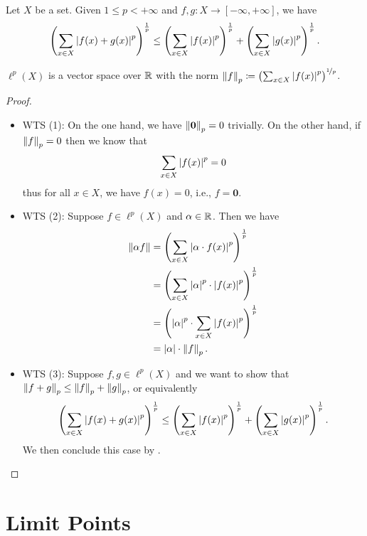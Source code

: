 \documentclass{techreport}
\begin{document}
\begin{theorem}\label{The:MinkowskisInequality}
	Let $X$ be a set.
	Given $1 \le p < +\infty$ and $f,g:X \to [-\infty,+\infty]$, we have
	\begin{equation*}
		\left({ \sum_{x \in X} \left|{f(x)+g(x)}\right|^p }\right)^{\frac{1}{p}} \le \left({ \sum_{x \in X} \left|{f(x)}\right|^p }\right)^{\frac{1}{p}} + \left({ \sum_{x \in X} \left|{g(x)}\right|^p }\right)^{\frac{1}{p}}.
	\end{equation*}
\end{theorem}

\begin{proposition}\label{Prop:lpVectorSpace}
	$\ell^p(X)$ is a vector space over $\mathbb{R}$ with the norm $\left\|{f}\right\|_p \coloneqq  \left({\sum_{x \in X} \left|{f(x)}\right|^p}\right)^{\nicefrac{1}{p}}$.
\end{proposition}
\begin{proof}
	\begin{itemize}
		\item WTS (1):
		On the one hand, we have $\left\|{\mathbf{0}}\right\|_p = 0$ trivially.
		On the other hand, if $\left\|{f}\right\|_p = 0$ then we know that
		\[
		\sum_{x \in X} \left|{f(x)}\right|^p = 0
		\]
		thus for all $x \in X$, we have $f(x) = 0$, i.e., $f = \mathbf{0}$.
		
		\item WTS (2): Suppose $f \in \ell^p(X)$ and $\alpha \in \mathbb{R}$.
		Then we have
		\begin{align*}
			\left\|{\alpha f}\right\| & = \left({\sum_{x \in X} \left|{\alpha \cdot f(x)}\right|^p}\right)^{\frac{1}{p}} \\
			& = \left({ \sum_{x \in X} \left|{\alpha}\right|^p \cdot \left|{f(x)}\right|^p}\right)^\frac{1}{p} \\
			& = \left({ \left|{\alpha}\right|^p \cdot \sum_{x \in X} \left|{f(x)}\right|^p }\right)^\frac{1}{p} \\
			& = \left|{\alpha}\right| \cdot \left\|{f}\right\|_p.
		\end{align*}
		
		\item WTS (3): Suppose $f,g \in \ell^p(X)$ and we want to show that $\left\|{f+g}\right\|_p \le \left\|{f}\right\|_p+\left\|{g}\right\|_p$, or equivalently
		\[
		\left({ \sum_{x \in X} \left|{f(x) + g(x)}\right|^p }\right)^\frac{1}{p} \le \left({ \sum_{x \in X} \left|{f(x)}\right|^p}\right)^\frac{1}{p} + \left({ \sum_{x \in X} \left|{g(x)}\right|^p}\right)^\frac{1}{p}.
		\]
		We then conclude this case by .
	\end{itemize}
\end{proof}

\section{Limit Points}
\end{document}
